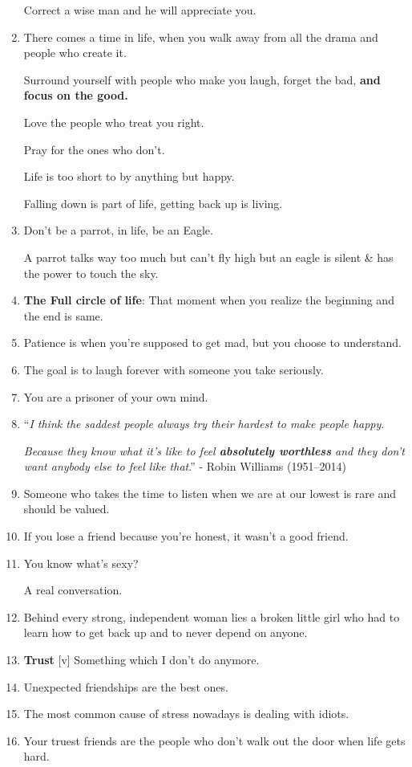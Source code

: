 \documentclass{article}
\begin{document}
\begin{enumerate}
	Correct a wise man and he will appreciate you.
	\item There comes a time in life, when you walk away from all the drama and people who create it.
	
	Surround yourself with people who make you laugh, forget the bad, \textbf{and focus on the good.}
	
	Love the people who treat you right.
	
	Pray for the ones who don't.
	
	Life is too short to by anything but happy.
	
	Falling down is part of life, getting back up is living.
	\item Don't be a parrot, in life, be an Eagle.
	
	A parrot talks way too much but can't fly high but an eagle is silent \& has the power to touch the sky.
	\item \textbf{The Full circle of life}: That moment when you realize the beginning and the end is same.
	\item Patience is when you're supposed to get mad, but you choose to understand.
	\item The goal is to laugh forever with someone you take seriously.
	\item You are a prisoner of your own mind.
	\item ``\textit{I think the saddest people always try their hardest to make people happy}.
	
	\textit{Because they know what it's like to feel \textbf{absolutely worthless} and they don't want anybody else to feel like that}.'' - Robin Williams (1951--2014)
	\item Someone who takes the time to listen when we are at our lowest is rare and should be valued.
	\item If you lose a friend because you're honest, it wasn't a good friend.
	\item You know what's sexy?
	
	A real conversation.
	\item Behind every strong, independent woman lies a broken little girl who had to learn how to get back up and to never depend on anyone.
	\item \textbf{Trust} [v] Something which I don't do anymore.
	\item Unexpected friendships are the best ones.
	\item The most common cause of stress nowadays is dealing with idiots.
	\item Your truest friends are the people who don't walk out the door when life gets hard.
	

\end{enumerate}
\end{document}
